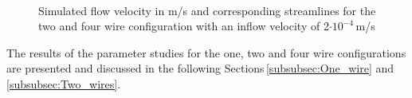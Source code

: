 \begin{figure}
\begin{subfigure}{0.49\textwidth}
        \end{subfigure}
        \\
        
        \caption[Simulated flow velocity and corresponding streamlines around two and four wires]{Simulated flow velocity in m/s and corresponding streamlines for the two and four wire configuration with an inflow velocity of 2$\cdotp 10^{-4}$\,m/s}
        \label{fig:tw_fw_flow_field}
  \end{figure}  
 
The results of the parameter studies for the one, two and four wire configurations are presented and discussed in the following Sections\,\ref{subsubsec:One_wire} and \ref{subsubsec:Two_wires}. 
\FloatBarrier

% 



